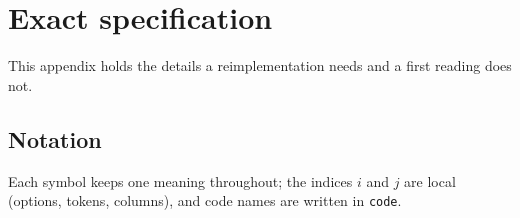 \documentclass[10pt]{article}
\begin{document}
{\footnotesize\raggedright\setlength{\bibsep}{1.5pt plus 0.5pt}


}

\appendix
\section{Exact specification}\label{sec:A}

This appendix holds the details a reimplementation needs and a first reading does not.

\subsection{Notation}\label{sec:A.1}

Each symbol keeps one meaning throughout; the indices $i$ and $j$ are local (options, tokens, columns), and code names are written in \texttt{code}.
\end{document}
